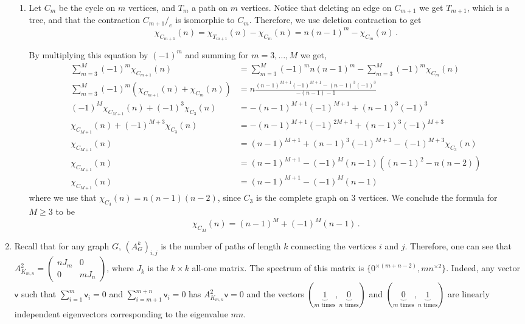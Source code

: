 \documentclass[kulak]{tplt}
\theoremstyle{definition}
\newcommand{\vv}{\mathsf{v}}
\begin{document}
\begin{enumerate}
\begin{enumerate}
\item 
Let $C_m$ be the cycle on $m$ vertices, and $T_m$ a path on $m$ vertices.
Notice that deleting an edge on $C_{m+1}$ we get $T_{m+1}$, which is a tree, and that the contraction $C_{m+1}/_e$ is isomorphic to $C_m$.
Therefore, we use deletion contraction to get 
$$\chi_{C_{m+1}}(n) =  \chi_{T_{m+1}}(n) - \chi_{C_m}(n) =  n(n-1)^m - \chi_{C_m}(n) \, . $$

By multiplying this equation by $(-1)^m$ and summing for $m=3, \ldots, M$ we get,
\begin{align*}
\sum_{m=3}^M (-1)^m\chi_{C_{m+1}}(n) &= \sum_{m=3}^M (-1)^m n(n-1)^m - \sum_{m=3}^M (-1)^m \chi_{C_{m}}(n) \\
\sum_{m=3}^M (-1)^m(\chi_{C_{m+1}}(n) + \chi_{C_{m}}(n) ) &= n \frac{(n-1)^{M+1}(-1)^{M+1} - (n-1)^3(-1)^3}{-(n-1) -  1}\\
(-1)^M \chi_{C_{M+1}}(n) + (-1)^3 \chi_{C_{3}}(n) &= -(n-1)^{M+1}(-1)^{M+1} + (n-1)^3(-1)^3\\
\chi_{C_{M+1}}(n) + (-1)^{M+3} \chi_{C_{3}}(n) &= -(n-1)^{M+1}(-1)^{2M+1} + (n-1)^3(-1)^{M+3}\\
\chi_{C_{M+1}}(n) &= (n-1)^{M+1} + (n-1)^3(-1)^{M+3} - (-1)^{M+3} \chi_{C_{3}}(n)\\
\chi_{C_{M+1}}(n) &= (n-1)^{M+1} - (-1)^M(n-1)\left( (n-1)^2 - n(n-2) \right) \\
\chi_{C_{M+1}}(n) &= (n-1)^{M+1} - (-1)^M(n-1)
\end{align*}
where we use that $\chi_{C_{3}}(n) = n(n-1)(n-2)$, since $C_{3}$ is the complete graph on $3$ vertices.
We conclude the formula for $M\geq 3$ to be
$$\chi_{C_M}(n) = (n-1)^M + (-1)^M(n-1) \, . $$
\end{enumerate}


\item 
Recall that for any graph $G$, $(A_G^k)_{i, j}$ is the number of paths of length $k$ connecting the vertices $i$ and $j$.
Therefore, one can see that $A_{K_{m, n}}^2 = \begin{pmatrix}
n J_m & 0 \\ 0 & mJ_n
\end{pmatrix}$, where $J_k$ is the $k\times k$ all-one matrix.
The spectrum of this matrix is $\{ 0 ^{\times (m+n-2) }, mn^{\times 2}\}$.
Indeed, any vector $\vv $ such that $\sum_{i=1}^m \vv_i = 0$ and $\sum_{i=m+1}^{m+n} \vv_i = 0$ has $A_{K_{m, n}}^2\vv =0 $ and the vectors $(\underbrace{1}_{m \text{ times}}, \underbrace{0}_{n \text{ times}})$ and  $ (\underbrace{0}_{m \text{ times}}, \underbrace{1}_{n \text{ times}})$ are linearly independent eigenvectors corresponding to the eigenvalue $mn$.


\end{enumerate}
\end{document}
